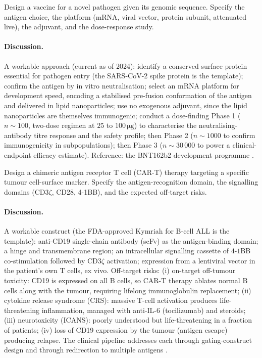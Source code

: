 \begin{exercise}
Design a vaccine for a novel pathogen given its genomic sequence.
Specify the antigen choice, the platform (mRNA, viral vector,
protein subunit, attenuated live), the adjuvant, and the
dose-response study.
\end{exercise}

\paragraph{Discussion.}
A workable approach (current as of 2024): identify a conserved
surface protein essential for pathogen entry (the SARS-CoV-2 spike
protein is the template); confirm the antigen by in vitro
neutralisation; select an mRNA platform for development speed,
encoding a stabilised pre-fusion conformation of the antigen and
delivered in lipid nanoparticles; use no exogenous adjuvant, since
the lipid nanoparticles are themselves immunogenic; conduct a
dose-finding Phase 1 ($n \sim 100$, two-dose regimen at $25$ to
$100\,\si{\micro\gram}$) to characterise the neutralising-antibody
titre response and the safety profile; then Phase 2 ($n \sim 1000$
to confirm immunogenicity in subpopulations); then Phase 3
($n \sim 30\,000$ to power a clinical-endpoint efficacy estimate).
Reference: the BNT162b2 development programme
\cite{paper:v6c07-mrna-pfizer-2020}.

\begin{exercise}
Design a chimeric antigen receptor T cell (CAR-T) therapy targeting
a specific tumour cell-surface marker. Specify the antigen-recognition
domain, the signalling domains (CD3$\zeta$, CD28, 4-1BB), and the
expected off-target risks.
\end{exercise}

\paragraph{Discussion.}
A workable construct (the FDA-approved Kymriah for B-cell ALL is the
template): anti-CD19 single-chain antibody (scFv) as the
antigen-binding domain; a hinge and transmembrane region; an
intracellular signalling cassette of $4$-$1$BB co-stimulation
followed by CD3$\zeta$ activation; expression from a lentiviral
vector in the patient's own T cells, ex vivo. Off-target risks:
(i) on-target off-tumour toxicity: CD19 is expressed on all B cells,
so CAR-T therapy ablates normal B cells along with the tumour,
requiring lifelong immunoglobulin replacement; (ii) cytokine release
syndrome (CRS): massive T-cell activation produces life-threatening
inflammation, managed with anti-IL-6 (tocilizumab) and steroids;
(iii) neurotoxicity (ICANS): poorly understood but life-threatening
in a fraction of patients; (iv) loss of CD19 expression by the tumour
(antigen escape) producing relapse. The clinical pipeline addresses
each through gating-construct design and through redirection to
multiple antigens \cite{paper:v6c07-june-cart-2018}.


